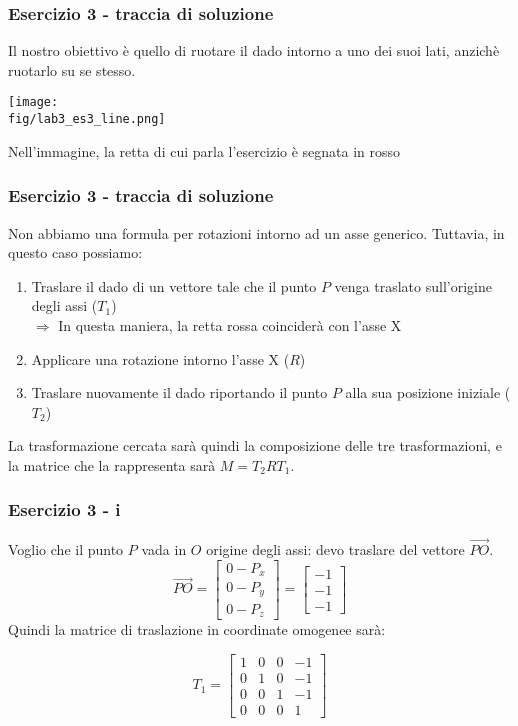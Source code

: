 \documentclass{beamer}
\newcommand{\fig}{figures} %
\begin{document}
\begin{frame}
\frametitle{Esercizio 3 - traccia di soluzione}
Il nostro obiettivo \`e quello di ruotare il dado intorno a uno dei suoi lati, anzich\`e ruotarlo
su se stesso.

    \vspace{0.5cm}

    \centering
    \texttt{[image: \\fig/lab3\_es3\_line.png]}

Nell'immagine, la retta di cui parla l'esercizio \`e segnata in rosso

\end{frame}

\begin{frame}
\frametitle{Esercizio 3 - traccia di soluzione}
Non abbiamo una formula per rotazioni intorno ad un asse generico. Tuttavia,
in questo caso possiamo:
    \begin{enumerate}
        \item Traslare il dado di un vettore tale che il punto $P$ venga traslato sull'origine degli assi ($T_1$) \\
            $\Rightarrow$ In questa maniera, la retta rossa coincider\`a con l'asse X
        \item Applicare una rotazione intorno l'asse X ($R$)
        \item Traslare nuovamente il dado riportando il punto $P$ alla sua posizione iniziale ($T_2$)
    \end{enumerate}

    La trasformazione cercata sar\`a quindi la composizione delle tre trasformazioni, e la
    matrice che la rappresenta sar\`a $M= T_2 R T_1$.
\end{frame}

\begin{frame}
\frametitle{Esercizio 3 - i}
Voglio che il punto $P$ vada in $O$ origine degli assi: devo traslare del vettore
$\overrightarrow{PO}$.
\begin{displaymath}
    \overrightarrow{PO}
    = 
\begin{bmatrix}
        0 - P_x\\
        0 - P_y\\
        0 - P_z
\end{bmatrix}
    = 
\begin{bmatrix}
        - 1\\
        - 1\\
        - 1
\end{bmatrix}
\end{displaymath}
Quindi la matrice di traslazione in coordinate omogenee sar\`a:

\begin{displaymath}
T_1 = 
\begin{bmatrix}
        1 & 0 & 0 & -1\\
        0 & 1 & 0 & -1\\
        0 & 0 & 1 & -1\\
        0 & 0 & 0 & 1 
\end{bmatrix}
\end{displaymath}
\end{frame}
\end{document}
